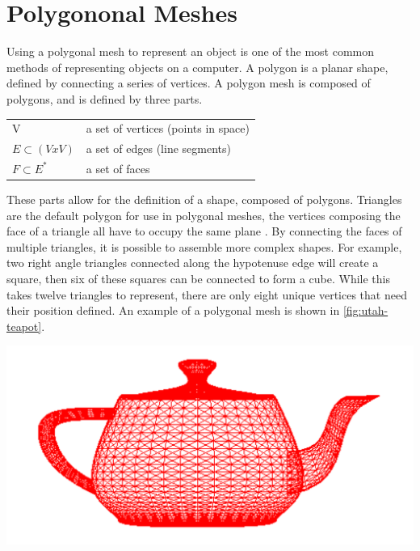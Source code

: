\documentclass[10pt]{report}
\begin{document}
		\section{Polygononal Meshes}
	
		Using a polygonal mesh to represent an object is one of the most common methods of representing objects on a computer. A polygon is a planar shape, defined by connecting a series of vertices. A polygon mesh is composed of polygons, and is defined by three parts.
		
		\begin{center}
			\begin{tabular}{ l l } 
				V & a set of vertices (points in space)\\ 
				$E {\subset} (V x V)$ & a set of edges (line segments)\\ 
				$F {\subset} E^{\ast}$  & a set of faces \\
			\end{tabular}
		\end{center}
	
		These parts allow for the definition of a shape, composed of polygons. Triangles are the default polygon for use in polygonal meshes, the vertices composing the face of a triangle all have to occupy the same plane \cite{polygon}. By connecting the faces of multiple triangles, it is possible to assemble more complex shapes. For example, two right angle triangles connected along the hypotenuse edge will create a square, then six of these squares can be connected to form a cube. While this takes twelve triangles to represent, there are only eight unique vertices that need their position defined. An example of a polygonal mesh is shown in \autoref{fig:utah-teapot}.
		
		\begin{minipage}{\textwidth}
			\centering
			\includegraphics[scale=0.3]{utah-teapot}
			\label{fig:utah-teapot}
		\end{minipage}	
		
\end{document}
